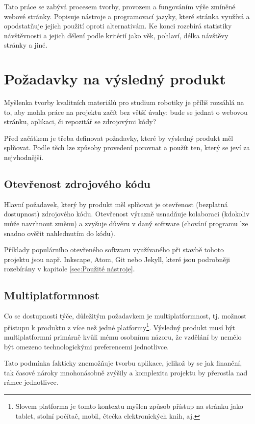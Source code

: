 \documentclass[a4paper, 12pt]{article}
\begin{document}
  Tato práce se zabývá procesem tvorby, provozem a fungováním výše zmíněné webové stránky. Popisuje nástroje a programovací jazyky, které stránka využívá a opodstatňuje jejich použití oproti alternativám. Ke konci rozebírá statistiky návštěvnosti a jejich dělení podle kritérií jako věk, pohlaví, délka návštěvy stránky a jiné.

  \newpage

  \section{Požadavky na výsledný produkt}
  Myšlenka tvorby kvalitních materiálů pro studium robotiky je příliš rozsáhlá na to, aby mohla práce na projektu začít bez větší úvahy: bude se jednat o webovou stránku, aplikaci, či repozitář se zdrojovými kódy?

  Před začátkem je třeba definovat požadavky, které by výsledný produkt měl splňovat. Podle těch lze způsoby provedení porovnat a použít ten, který se jeví za nejvhodnější.


  \subsection{Otevřenost zdrojového kódu}
  Hlavní požadavek, který by produkt měl splňovat je otevřenost (bezplatná dostupnost) zdrojového kódu. Otevřenost výrazně usnadňuje kolaboraci (kdokoliv může navrhnout změnu) a zvyšuje důvěru v daný software (chování programu lze snadno ověřit nahlednutím do kódu).

  Příklady populárního otevřeného softwaru využívaného při stavbě tohoto projektu jsou např. Inkscape\cite{inkscape-source}, Atom\cite{atom-source}, Git\cite{git-source} nebo Jekyll\cite{jekyll-source}, které jsou podrobněji rozebírány v kapitole \ref{sec:Použité nástroje}.


  \subsection{Multiplatformnost}
  Co se dostupnosti týče, důležitým požadavkem je multiplatformnost, tj. možnost přístupu k produktu z více než jedné platformy\footnote{Slovem platforma je tomto kontextu myšlen způsob přístup na stránku jako tablet, stolní počítač, mobil, čtečka elektronických knih, aj.}. Výsledný produkt musí být multiplatformní primárně kvůli mému osobnímu názoru, že vzdělání by nemělo být omezeno technologickými preferencemi jednotlivce.

  Tato podmínka fakticky znemožňuje tvorbu aplikace, jelikož by se jak finanční\cite{apple-store-membership,android-store-membership,wedos-hosting}, tak časové nároky mnohonásobně zvýšily a komplexita projektu by přerostla nad rámec jednotlivce.
\end{document}
